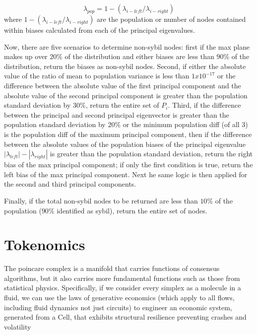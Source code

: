 \documentclass{article}
\theoremstyle{definition}
\theoremstyle{remark}
\theoremstyle{plain}
\begin{document}
\begin{equation}
\lambda_{pop} = 1-(\lambda_{i-left}/\lambda_{i-right})
\end{equation}
where $1-(\lambda_{i-left}/\lambda_{i-right})$  are the population or number of nodes contained within biases calculated from each of the principal eigenvalues.

Now, there are five scenarios to determine non-sybil nodes: first if the max plane makes up over $20\%$ of the distribution and either biases are less than $90\%$ of the distribution, return the biases as non-sybil nodes. Second, if either the absolute value of the ratio of mean to population variance is less than $1x10^{-17}$ or the difference between the absolute value of the first principal component and the  absolute value of the second principal component is greater than the population standard deviation by $30\%$, return the entire set of $P_i$. Third, if the difference between the principal and second principal eigenvector is greater than the population standard deviation by $20\%$ or the minimum population diff (of all 3) is the population diff of the maximum principal component, then if the difference between the absolute values of the population biases of the principal eigenvalue $|\lambda_{left}| - |\lambda_{right}|$ is greater than the population standard deviation, return the right bias of the max principal component; if only the first condition is true, return the left bias of the max principal component. Next he same logic is then applied for the second and third principal components. 

Finally, if the total non-sybil nodes to be returned are less than $10\%$ of the population ($90\%$ identified as sybil), return the entire set of nodes.

\section{Tokenomics}
The poincare complex is a manifold that carries functions of consensus algorithms, but it also carries more fundamental functions such as those from statistical physics. Specifically, if we consider every simplex as a molecule in a fluid, we can use the laws of generative economics (which apply to all flows, including fluid dynamics not just circuits) to engineer an economic system, generated from a Cell, that exhibits structural resilience preventing crashes and volatility
\end{document}
